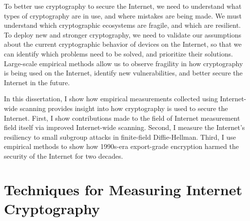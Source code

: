 To better use cryptography to secure the Internet, we need to understand what
types of cryptography are in use, and where mistakes are being made. We must
understand which cryptographic ecosystems are fragile, and which are
resilient. To deploy new and stronger cryptography, we need to validate our
assumptions about the current cryptographic behavior of devices on the
Internet, so that we can identify which problems need to be solved, and
prioritize their solutions. Large-scale empirical methods allow us to observe
fragility in how cryptography is being used on the Internet, identify new
vulnerabilities, and better secure the Internet in the future.

In this dissertation, I show how empirical measurements collected using
Internet-wide scanning provides insight into how cryptography is used to
secure the Internet. First, I show contributions made to the field of
Internet measurement field itself via improved Internet-wide scanning.
Second, I measure the Internet's resiliency to small subgroup attacks in
finite-field Diffie-Hellman. Third, I use empirical methods to show how
1990s-era export-grade encryption harmed the security of the Internet for two
decades.

\section{Techniques for Measuring Internet Cryptography}


